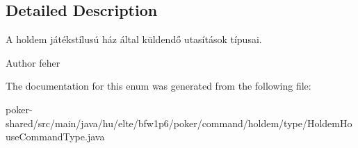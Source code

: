 \subsection{Detailed Description}
A holdem játékstílusú ház által küldendő utasítások típusai. \begin{DoxyAuthor}{Author}
feher 
\end{DoxyAuthor}


The documentation for this enum was generated from the following file\+:\begin{DoxyCompactItemize}
\item 
poker-\/shared/src/main/java/hu/elte/bfw1p6/poker/command/holdem/type/Holdem\+House\+Command\+Type.\+java\end{DoxyCompactItemize}
